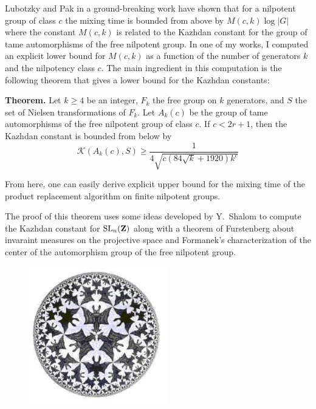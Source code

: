 Lubotzky and Pak in a ground-breaking work have shown that for a nilpotent group of class $c$ the mixing time is bounded from above by $M(c,k) \log |G|$ where the constant $M(c,k)$ is related to the Kazhdan constant for the group of tame automorphisms of the free nilpotent group. In one of my works, I computed an explicit lower bound for $M(c,k)$ as a function of the number of generators $k$ and the nilpotency class $c$. The main ingredient in this computation is
the following theorem that gives a lower bound for the Kazhdan constants:
 
{\bf Theorem.}
Let $k \ge 4$ be an integer, $F_k$ the free group on $k$ generators, and $S$
the set of Nielsen transformations of $F_k$. Let $A_k(c)$ be the group of tame
automorphisms of the free nilpotent group of class $c$. If $c<2r+1$, then the
Kazhdan constant is bounded from below by $${\mathcal K} (A_k(c), S) \ge 
\frac{1}{4\sqrt{c(84\sqrt{k}+1920)k^c}} $$ 

From here, one can easily derive explicit upper bound for the mixing time of
the product  replacement algorithm on finite nilpotent groups.

The proof of this theorem uses some ideas developed by Y.~Shalom to compute the
Kazhdan  constant for ${\rm SL}_n ({\bf Z})$ along with a theorem of
Furstenberg about invaraint  measures on the projective space and Formanek's
characterization of the center of the automorphism group of the free nilpotent
group.


\begin{figure}[ht]
 \begin{center}
   \includegraphics[width=6cm]{Mallahi-Karai/escher.jpg}
   \label{fig:escher}
  \end{center}
\end{figure}

